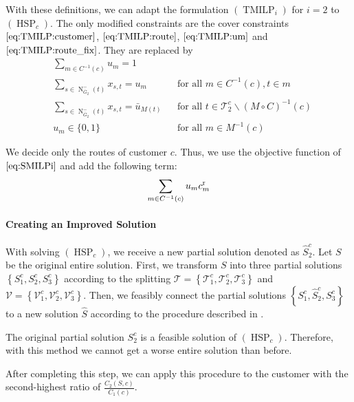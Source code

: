With these definitions, we can adapt the formulation $(\operatorname{TMILP}_i)$ for $i=2$ to $(\operatorname{HSP}_c)$. The only modified constraints are the cover constraints $\eqref{eq:TMILP:customer}$, $\eqref{eq:TMILP:route}$, $\eqref{eq:TMILP:um}$ and $\eqref{eq:TMILP:route_fix}$. They are replaced by
\begin{align}
	& \sum_{m\in C^{-1}(c)} u_m = 1 \label{eq:HSP:customer} \\
	& \sum_{s\in\operatorname{N}_{\overline{G}_2}^-(t)} x_{s,t} = u_m && \text{for all } m\in C^{-1}(c),t\in m \label{eq:HSP:route} \\
	& \sum_{s\in\operatorname{N}_{\overline{G}_2}^-(t)} x_{s,t} = \bar{u}_{M(t)} && \text{for all } t\in\mathcal{T}^c_2\backslash(M\circ C)^{-1}(c) \label{eq:HSP:route_fix} \\
	& u_m\in\{0,1\} && \text{for all } m\in M^{-1}(c) \label{eq:HSP:um}
\end{align}

We decide only the routes of customer $c$. Thus, we use the objective function of $\eqref{eq:SMILPi}$ and add the following term:
\begin{align*}
	\sum_{m\in C^{-1}(c)} u_m c^{\operatorname{r}}_m
\end{align*}

\paragraph{Creating an Improved Solution} \parfill

With solving $(\operatorname{HSP}_c)$, we receive a new partial solution denoted as $\hat{S}^c_2$. Let $S$ be the original entire solution. First, we transform $S$ into three partial solutions $\left\{S^c_1,S^c_2,S^c_3\right\}$ according to the splitting $\mathcal{T}=\left\{\mathcal{T}^c_1,\mathcal{T}^c_2,\mathcal{T}^c_3\right\}$ and $\mathcal{V}=\left\{\mathcal{V}^c_1,\mathcal{V}^c_2,\mathcal{V}^c_3\right\}$. Then, we feasibly connect the partial solutions $\left\{S^c_1,\hat{S}^c_2,S^c_3\right\}$ to a new solution $\hat{S}$ according to the procedure described in .

The original partial solution $S^c_2$ is a feasible solution of $(\operatorname{HSP}_c)$. Therefore, with this method we cannot get a worse entire solution than before.

After completing this step, we can apply this procedure to the customer with the second-highest ratio of $\frac{C_2(S,c)}{C_1(c)}$.

